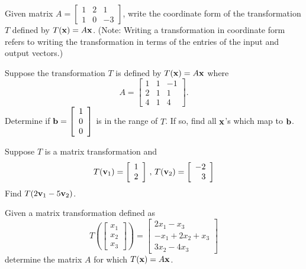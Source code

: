 
\be 
\item Given matrix $A=\left[ \begin{array}{ccr} 1& 2 & 1 \\ 1 & 0 & -3 \end{array} \right]$, write the coordinate form of the transformation $T$ defined by $T(\mathbf{x})=A\mathbf{x}$. (Note: Writing a transformation in coordinate form refers to writing the transformation in terms of the entries of the input and output vectors.)

\item Suppose the transformation $T$ is defined by $T(\mathbf{x})=A\mathbf{x}$ where 
\[A=\left[ \begin{array}{ccr} 1&1&-1 \\ 2&1&1 \\ 4&1&4 \end{array} \right].\] Determine if $\mathbf{b}=\left[ \begin{array}{c} 1\\0\\0 \end{array} \right]$ is in the range of $T$. If so, find all $\mathbf{x}$'s which map to $\mathbf{b}$.

\item Suppose $T$ is a matrix transformation and 
\[ T(\mathbf{v}_1) = \left[ \begin{array}{c} 1 \\ 2 \end{array} \right] \, , \, T(\mathbf{v}_2) = \left[ \begin{array}{r} -2 \\ 3 \end{array} \right] \]
Find $T(2\mathbf{v}_1 -5 \mathbf{v}_2)$.

\item Given a matrix transformation defined as 
\[ T\left( \left[ \begin{array}{c} x_1 \\ x_2 \\ x_3 \end{array} \right] \right) = \left[ \begin{array}{c} 2x_1 -x_3 \\ -x_1 +2x_2 +x_3 \\ 3x_2 - 4x_3 \end{array} \right] \]
determine the matrix $A$ for which $T(\mathbf{x}) = A\mathbf{x}$.


